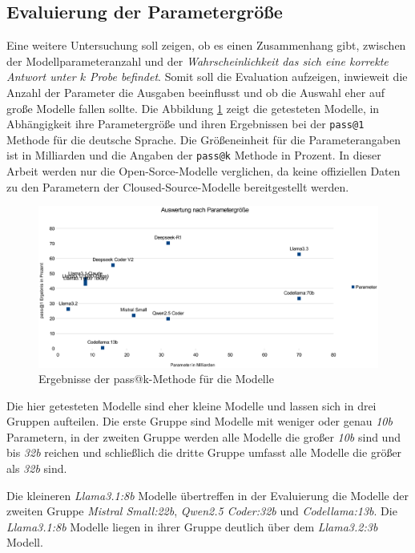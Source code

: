 \subsection{Evaluierung der Parametergröße}
Eine weitere Untersuchung soll zeigen, ob es einen Zusammenhang gibt, zwischen der Modellparameteranzahl und der \textit{Wahrscheinlichkeit das sich eine korrekte Antwort unter $k$ Probe befindet}. Somit soll die Evaluation aufzeigen, inwieweit die Anzahl der Parameter die Ausgaben beeinflusst und ob die Auswahl eher auf große Modelle fallen sollte. Die Abbildung \ref{img:results_by_llm_param} zeigt die getesteten Modelle, in Abhängigkeit ihre Parametergröße und ihren Ergebnissen bei der \texttt{pass@1} Methode für die deutsche Sprache. Die Größeneinheit für die Parameterangaben ist in Milliarden und die Angaben der \texttt{pass@k} Methode in Prozent. In dieser Arbeit werden nur die Open-Sorce-Modelle verglichen, da keine offiziellen Daten zu den Parametern der Cloused-Source-Modelle bereitgestellt werden.\vspace{0.2cm}

\begin{figure}[!ht]
	\includegraphics[width=\textwidth]{content/chapter_evaluation/images/llm_evaluation_param.eps}
	\centering
	\caption{Ergebnisse der pass@k-Methode für die Modelle}
	\label{img:results_by_llm_param}
\end{figure}

Die hier getesteten Modelle sind eher kleine Modelle und lassen sich in drei Gruppen aufteilen. Die erste Gruppe sind Modelle mit weniger oder genau \textit{10b} Parametern, in der zweiten Gruppe werden alle Modelle die großer \textit{10b} sind und bis \textit{32b} reichen und schließlich die dritte Gruppe umfasst alle Modelle die größer als \textit{32b} sind.\vspace{0.2cm}

Die kleineren \textit{Llama3.1:8b} Modelle übertreffen in der Evaluierung die Modelle der zweiten Gruppe \textit{Mistral Small:22b}, \textit{Qwen2.5 Coder:32b} und \textit{Codellama:13b}. Die \textit{Llama3.1:8b} Modelle liegen in ihrer Gruppe deutlich über dem \textit{Llama3.2:3b} Modell.\vspace{0.2cm}

